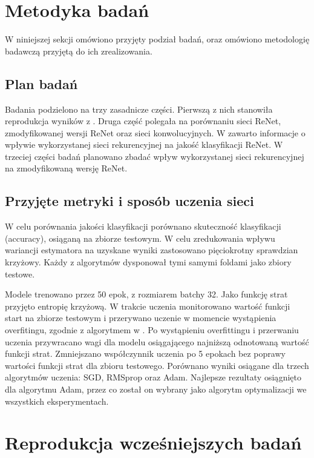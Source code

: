 \documentclass[oneside, mag]{mgr}
\begin{document}
\section{Metodyka badań}
W niniejszej sekcji omówiono przyjęty podział badań, oraz omówiono metodologię badawczą przyjętą do ich zrealizowania.

\subsection{Plan badań}
Badania podzielono na trzy zasadnicze części. Pierwszą z nich stanowiła reprodukcja wyników z \cite{DBLP:journals/corr/VisinKCMCB15}. Druga część polegała na porównaniu sieci ReNet, zmodyfikowanej wersji ReNet oraz sieci konwolucyjnych. W \cite{DBLP:journals/corr/VisinKCMCB15} zawarto informacje o wpływie wykorzystanej sieci rekurencyjnej na jakość klasyfikacji ReNet. W trzeciej części badań planowano zbadać wpływ wykorzystanej sieci rekurencyjnej na zmodyfikowaną wersję ReNet.

\subsection{Przyjęte metryki i sposób uczenia sieci}
W celu porównania jakości klasyfikacji porównano skuteczność klasyfikacji (accuracy), osiąganą na zbiorze testowym. W celu zredukowania wpływu wariancji estymatora na uzyskane wyniki zastosowano pięciokrotny sprawdzian krzyżowy. Każdy z algorytmów dysponował tymi samymi foldami jako zbiory testowe. 

Modele trenowano przez 50 epok, z rozmiarem batchy 32. Jako funkcję strat przyjęto entropię krzyżową. W trakcie uczenia monitorowano wartość funkcji start na zbiorze testowym i przerywano uczenie w momencie wystąpienia overfitingu, zgodnie z algorytmem w \cite{Goodfellow-et-al-2016}. Po wystąpieniu overfittingu i przerwaniu uczenia przywracano wagi dla modelu osiągającego najniższą odnotowaną wartość funkcji strat. Zmniejszano współczynnik uczenia po 5 epokach bez poprawy wartości funkcji strat dla zbioru testowego. Porównano wyniki osiągane dla trzech algorytmów uczenia: SGD, RMSprop oraz Adam. Najlepsze rezultaty osiągnięto dla algorytmu Adam, przez co został on wybrany jako algorytm optymalizacji we wszystkich eksperymentach.

\section{Reprodukcja wcześniejszych badań}
\end{document}
